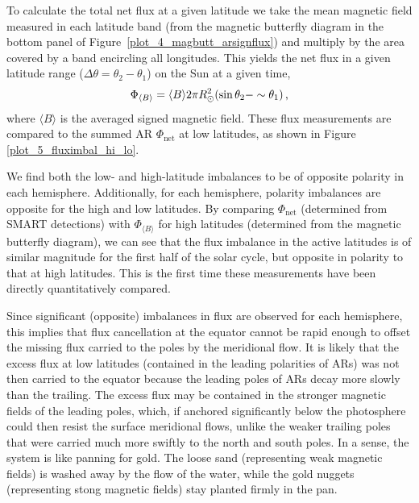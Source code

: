 To calculate the total net flux at a given latitude we take the mean magnetic field measured in each latitude band (from the magnetic butterfly diagram in the bottom panel of Figure~\ref{plot_4_magbutt_arsignflux}) and multiply by the area covered by a band encircling all longitudes. This yields the net flux in a given latitude range ($\Delta \theta=\theta_2-\theta_1$) on the Sun at a given time,
\begin{equation}
\Phi_{\langle B \rangle}=\langle B \rangle 2\pi R_{\odot}^2 (\sin\theta_2 - \sim\theta_1 ) \mbox{\,,}
\end{equation}
where $\langle B \rangle$ is the averaged signed magnetic field. These flux measurements are compared to the summed \gls{AR} $\Phi_{\mathrm{net}}$ at low latitudes, as shown in Figure\,\ref{plot_5_fluximbal_hi_lo}.

We find both the low- and high-latitude imbalances to be of opposite polarity in each hemisphere. Additionally, for each hemisphere, polarity imbalances are opposite for the high and low latitudes. By comparing $\Phi_{\mathrm{net}}$ (determined from \gls{SMART} detections) 
with $\Phi_{\langle B \rangle}$ for high latitudes (determined from the magnetic butterfly diagram), we can see that the flux imbalance in the active latitudes is of similar magnitude for the first half of the solar cycle, but opposite in polarity to that at high latitudes. This is the first time these measurements have been directly quantitatively compared. 

Since significant (opposite) imbalances in flux are observed for each hemisphere, this implies that flux cancellation at the equator cannot be rapid enough to offset the missing flux carried to the poles by the meridional flow. It is likely that the excess flux at low latitudes (contained in the leading polarities of \glspl{AR}) was not then carried to the equator because the leading poles of \glspl{AR} decay more slowly than the trailing. The excess flux may be contained in the stronger magnetic fields of the leading poles, which, if anchored significantly below the photosphere could then resist the surface meridional flows, unlike the weaker trailing poles that were carried much more swiftly to the north and south poles. In a sense, the system is like panning for gold. The loose sand (representing weak magnetic fields) is washed away by the flow of the water, while the gold nuggets (representing stong magnetic fields) stay planted firmly in the pan.

